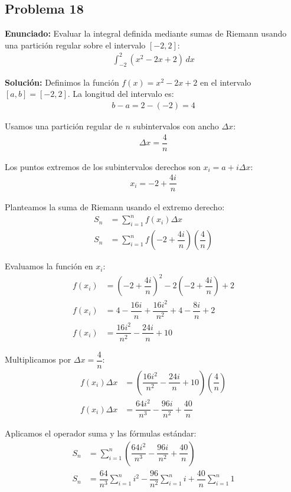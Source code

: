 \subsection*{Problema 18}
\textbf{Enunciado:} Evaluar la integral definida 
mediante sumas de Riemann usando una 
partición regular sobre el intervalo $[-2, 2]$:
\begin{align*}
\int_{-2}^{2} (x^2 - 2x + 2) \, dx
\end{align*}

\textbf{Solución:} 
Definimos la función $f(x) = x^2 - 2x + 2$ 
en el intervalo $[a, b] = [-2, 2]$. 
La longitud del intervalo es:
\begin{align*}
b - a = 2 - (-2) = 4
\end{align*}

Usamos una partición regular de $n$ subintervalos 
con ancho $\Delta x$:
\begin{align*}
\Delta x = \dfrac{4}{n}
\end{align*}

Los puntos extremos de los subintervalos 
derechos son $x_i = a + i\Delta x$:
\begin{align*}
x_i = -2 + \dfrac{4i}{n}
\end{align*}

Planteamos la suma de Riemann usando el 
extremo derecho:
\begin{align*}
S_n &= \sum_{i=1}^{n} f(x_i) \Delta x \\
S_n &= \sum_{i=1}^{n} f\left(-2 + \dfrac{4i}{n}\right) \left(\dfrac{4}{n}\right)
\end{align*}

Evaluamos la función en $x_i$:
\begin{align*}
f(x_i) &= \left(-2 + \dfrac{4i}{n}\right)^2 
- 2\left(-2 + \dfrac{4i}{n}\right) + 2 \\
f(x_i) &= 4 - \dfrac{16i}{n} + \dfrac{16i^2}{n^2} 
+ 4 - \dfrac{8i}{n} + 2 \\
f(x_i) &= \dfrac{16i^2}{n^2} - \dfrac{24i}{n} + 10
\end{align*}

Multiplicamos por $\Delta x = \dfrac{4}{n}$:
\begin{align*}
f(x_i)\Delta x &= \left(\dfrac{16i^2}{n^2} 
- \dfrac{24i}{n} + 10\right)\left(\dfrac{4}{n}\right) \\
f(x_i)\Delta x &= \dfrac{64i^2}{n^3} 
- \dfrac{96i}{n^2} + \dfrac{40}{n}
\end{align*}

Aplicamos el operador suma y las 
fórmulas estándar:
\begin{align*}
S_n &= \sum_{i=1}^{n} \left(\dfrac{64i^2}{n^3} 
- \dfrac{96i}{n^2} + \dfrac{40}{n}\right) \\
S_n &= \dfrac{64}{n^3}\sum_{i=1}^{n} i^2 
- \dfrac{96}{n^2}\sum_{i=1}^{n} i 
+ \dfrac{40}{n}\sum_{i=1}^{n} 1
\end{align*}

